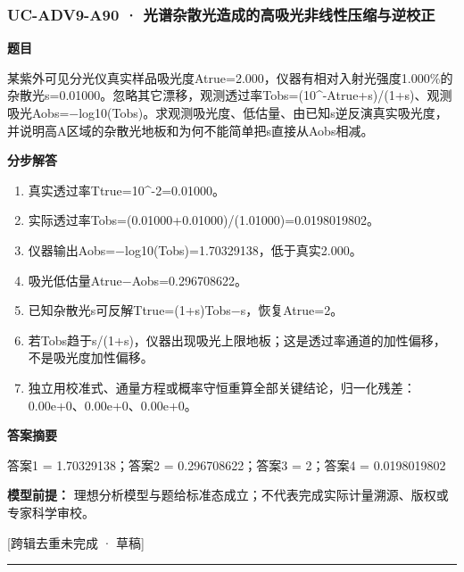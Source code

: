 \documentclass[UTF8,11pt,a4paper]{ctexart}
\begin{document}
\subsubsection*{UC-ADV9-A90 · 光谱杂散光造成的高吸光非线性压缩与逆校正}
\noindent\textbf{题目}\par
某紫外可见分光仪真实样品吸光度Atrue=2.000，仪器有相对入射光强度1.000\%的杂散光s=0.01000。忽略其它漂移，观测透过率Tobs=(10\textasciicircum{}-Atrue+s)/(1+s)、观测吸光Aobs=−log10(Tobs)。求观测吸光度、低估量、由已知s逆反演真实吸光度，并说明高A区域的杂散光地板和为何不能简单把s直接从Aobs相减。\par
\medskip\noindent\textbf{分步解答}
\begin{enumerate}
\item 真实透过率Ttrue=10\textasciicircum{}-2=0.01000。
\item 实际透过率Tobs=(0.01000+0.01000)/(1.01000)=0.0198019802。
\item 仪器输出Aobs=−log10(Tobs)=1.70329138，低于真实2.000。
\item 吸光低估量Atrue−Aobs=0.296708622。
\item 已知杂散光s可反解Ttrue=(1+s)Tobs−s，恢复Atrue=2。
\item 若Tobs趋于s/(1+s)，仪器出现吸光上限地板；这是透过率通道的加性偏移，不是吸光度加性偏移。
\item 独立用校准式、通量方程或概率守恒重算全部关键结论，归一化残差：0.00e+0、0.00e+0、0.00e+0。
\end{enumerate}
\noindent\textbf{答案摘要}\par
答案1 = 1.70329138；答案2 = 0.296708622；答案3 = 2；答案4 = 0.0198019802\par
\noindent\textbf{模型前提：}
理想分析模型与题给标准态成立；不代表完成实际计量溯源、版权或专家科学审校。\par
\noindent\textcolor{red!65!black}{[跨辑去重未完成 · 草稿]} \par
\medskip\hrule\medskip
{}
\end{document}
